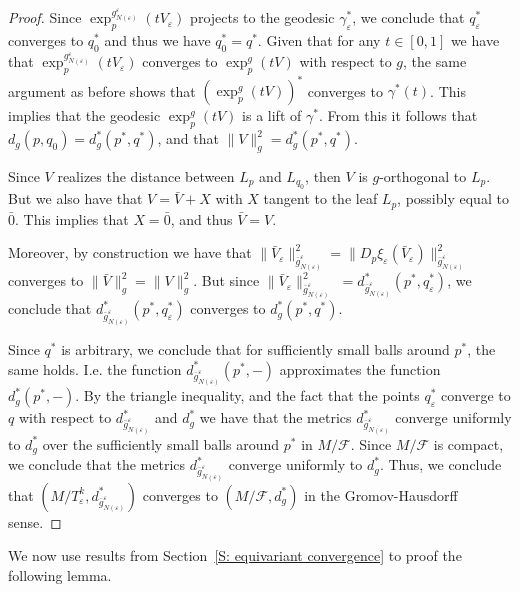 \documentclass[12pt,a4paper,reqno]{amsart}
\theoremstyle{definition}
\numberwithin{equation}{section}
\newcommand{\fol}{\mathcal{F}}
\begin{document}
\begin{proof}
Since $\exp_p^{g^\varepsilon_{N(\varepsilon)}}(tV_\varepsilon)$ projects to the geodesic $\gamma_\varepsilon^\ast$, we conclude that $q_\varepsilon^\ast$ converges to $q_0^\ast$ and thus we have $q_0^\ast = q^\ast$. Given that for any $t\in[0,1]$ we have that $\exp_p^{g^\varepsilon_{N(\varepsilon)}}(tV_\varepsilon)$ converges to $\exp_p^g(tV)$ with respect to $g$, the same argument as before shows that $(\exp_p^g(tV))^\ast$ converges to $\gamma^\ast(t)$. This implies that the geodesic  $\exp_p^g(tV)$ is a lift of $\gamma^\ast$.  From this it follows that $d_g(p,q_0) = d_g^\ast(p^\ast,q^\ast)$, and that $\|V\|^2_g = d^\ast_g(p^\ast,q^\ast)$.

Since  $V$ realizes the distance between $L_p$ and $L_{q_0}$, then $V$ is $g$-orthogonal to $L_p$. But we also have that $V=\bar{V}+X$ with $X$ tangent to the leaf $L_p$, possibly equal to $\bar{0}$. This implies that $X=\bar{0}$, and thus $\bar{V}=V$. 

Moreover, by construction we have that $\|\bar{V}_\varepsilon\|^2_{\bar{g}^\varepsilon_{N(\varepsilon)}}=\|D_p\xi_\varepsilon(\bar{V}_\varepsilon)\|^2_{\bar{g}^\varepsilon_{N(\varepsilon)}}$ converges to $\|\bar{V}\|^2_g=\|V\|^2_g$. But since $\|\bar{V}_\varepsilon\|^2_{\bar{g}^\varepsilon_{N(\varepsilon)}}$ $= d^\ast_{\bar{g}^\varepsilon_{N(\varepsilon)}}(p^\ast,q^\ast_\varepsilon)$, we conclude that $d^\ast_{\bar{g}^\varepsilon_{N(\varepsilon)}}(p^\ast,q^\ast_\varepsilon)$ converges to $d_g^\ast(p^\ast,q^\ast)$.

Since $q^\ast$ is arbitrary, we conclude that for sufficiently small balls around $p^\ast$, the same holds. I.e. the function $d^\ast_{\bar{g}^\varepsilon_{N(\varepsilon)}}(p^\ast,-)$ approximates the function $d_g^\ast(p^\ast,-)$. By the triangle inequality, and the fact that the points $q_\varepsilon^\ast$ converge to $q$ with respect to $d^\ast_{\bar{g}^\varepsilon_{N(\varepsilon)}}$ and $d^\ast_g$ we have that the metrics $d^\ast_{\bar{g}^\varepsilon_{N(\varepsilon)}}$ converge uniformly to $d^\ast_g$ over the sufficiently small balls around $p^\ast$ in $M/\fol$. Since $M/\fol$ is compact, we conclude that the metrics $d^\ast_{\bar{g}^\varepsilon_{N(\varepsilon)}}$ converge uniformly to $d^\ast_g$. Thus, we conclude that $(M/T^k_\varepsilon,d^\ast_{\bar{g}^\varepsilon_{N(\varepsilon)}})$ converges to $(M/\fol,d^\ast_g)$ in the Gromov-Hausdorff sense.
\end{proof}

We now use results from Section~\ref{S: equivariant convergence} to proof the following lemma.
\end{document}
